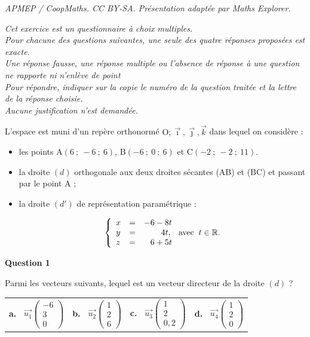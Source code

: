 \documentclass[10pt]{article}
\providecommand{\R}{\mathbb{R}}
\providecommand{\vect}[1]{\overrightarrow{#1}}
\providecommand{\Oijk}{\(\mathrm{O};\vec{\imath},\vec{\jmath},\vec{k}\)}
\begin{document}
\noindent\textit{APMEP / CoopMaths. CC BY-SA. Présentation adaptée par Maths Explorer.}\par\medskip
\medskip

\emph{Cet exercice est un questionnaire à choix multiples.\\ Pour chacune des questions suivantes, une seule des quatre réponses proposées est exacte.\\ Une réponse fausse, une réponse multiple ou l'absence de réponse à une question ne rapporte ni n'enlève de point \\ Pour répondre, indiquer sur la copie le numéro de la question traitée et la lettre de la réponse choisie.\\ Aucune justification n'est demandée.}

\medskip

L'espace est muni d'un repère orthonormé \Oijk{} dans lequel on considère :

\begin{itemize}
\item[$\bullet$~~] les points A$(6~;~-6~;~6)$,  B$(-6~;~0~;~6)$ et C$(-2~;~-2~;~11)$.
\item[$\bullet$~~] la droite $(d)$ orthogonale aux deux droites sécantes (AB) et (BC) et passant par le point A ;
\item[$\bullet$~~] la droite $\left(d'\right)$ de représentation paramétrique :

\[\left\{\begin{array}{l c l}
x &=& -6 - 8t\\
y &=& \phantom{-6 -}4t,\\
z &=& \phantom{-}6 + 5t
\end{array}\right. \text{avec }\:t \in \R.\]
\end{itemize}

\medskip

\textbf{Question 1}

Parmi les vecteurs suivants, lequel est un vecteur directeur de la droite $(d)$ ?

\begin{center}
\begin{tabularx}{\linewidth}{*{4}{X}}
\textbf{a.~} $\vect{u_1}\begin{pmatrix}-6\\3\\0\end{pmatrix}$&
\textbf{b.~} $\vect{u_2}\begin{pmatrix}1\\2\\6\end{pmatrix}$&
\textbf{c.~} $\vect{u_3}\begin{pmatrix}1\\2\\0,2\end{pmatrix}$&
\textbf{d.~} $\vect{u_4}\begin{pmatrix}1\\2\\0\end{pmatrix}$
\end{tabularx}
\end{center}
\end{document}
